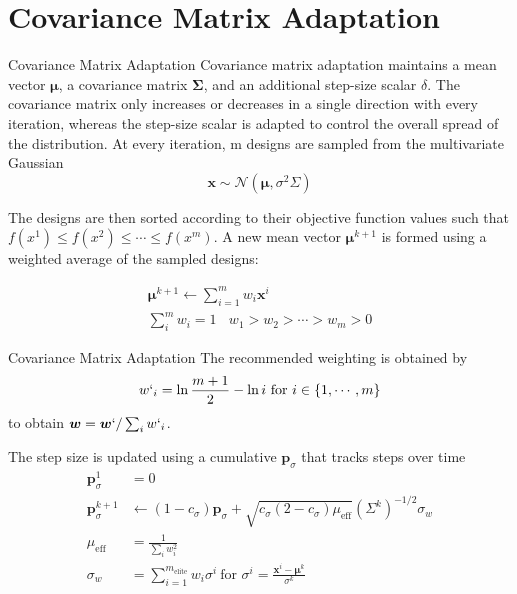\documentclass{beamer}
\begin{document}
\section{Covariance Matrix Adaptation}
\begin{frame}{Covariance Matrix Adaptation}
Covariance matrix adaptation maintains a mean vector $\boldsymbol{\mu}$, a covariance matrix $\boldsymbol{\Sigma}$, and an additional step-size scalar $\delta$. The covariance matrix only increases or decreases in a single direction with every iteration, whereas the step-size scalar is adapted to control the overall spread of the distribution. At every iteration, m designs are sampled from the multivariate Gaussian
\begin{equation*}
    \boldsymbol{x} \sim \mathcal{N} (\boldsymbol{\mu}, \sigma^2 \Sigma)
\end{equation*}

The designs are then sorted according to their objective function values such that $f(x^1) \leq f(x^2) \leq \cdots \leq f(x^m)$. A new mean vector  $\boldsymbol{\mu}^{k+1}$ is formed using a weighted average of the sampled designs:

\begin{gather*}
    \boldsymbol{\mu}^{k+1} \leftarrow \sum_{i=1}^m w_i \boldsymbol{x}^i\\
    \sum_i^m w_i = 1 ~~~~ w_1>w_2>\cdots>w_m>0    
\end{gather*}

\end{frame}

\begin{frame}{Covariance Matrix Adaptation}
The recommended weighting is obtained by
\begin{equation*}
    w`_i = \ln \frac{m+1}{2} - \ln i ~ \textrm{for~} i \in \{1, \cdots, m\}
\end{equation*}
to obtain $\boldsymbol{w} = \boldsymbol{w}`/\sum_i w`_i $.

The step size is updated using a cumulative $\boldsymbol{p}_\sigma$ that tracks steps over time
\begin{equation*}
    \begin{split}
        \boldsymbol{p}_\sigma^1 &= 0\\
        \boldsymbol{p}_\sigma^{k+1} &\leftarrow (1-c_\sigma)\boldsymbol{p}_\sigma + \sqrt{c_\sigma(2-c_\sigma)\mu_{\textrm{eff}}} (\Sigma^k)^{-1/2} \sigma_w \\
        \mu_{\textrm{eff}} &= \frac{1}{\sum_i w^2_i}\\
        \sigma_w &= \sum_{i=1}^{m_{\textrm{elite}}} 
        w_i \sigma^i ~ \textrm{for~} \sigma^i = \frac{\boldsymbol{x}^i - \boldsymbol{\mu}^k}{\sigma^k}
    \end{split}
\end{equation*}
\end{frame}
\end{document}
